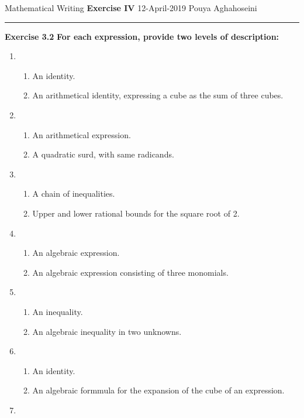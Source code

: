 \documentclass{article}
\begin{document}
\noindent
Mathematical Writing \hfill \textbf{Exercise IV} \newline 
{12-April-2019} \hfill Pouya Aghahoseini

\noindent
\rule{\linewidth}{0.4pt}
\textbf{\large\color{blue} Exercise 3.2}   \textbf{For each expression, provide two levels of description:}

	\begin{enumerate}
		\item 
		\begin{enumerate}[label=\roman*]
			\item  An identity.
			\item An arithmetical identity, expressing a cube as the sum of three cubes.
		\end{enumerate}
	\item
		\begin{enumerate}[label=\roman*]
			\item  An arithmetical expression.
			\item A quadratic surd, with same radicands.
		\end{enumerate}
	\item
		\begin{enumerate}[label=\roman*]
			\item  A chain of inequalities.
			\item Upper and lower rational bounds for the square root of 2.
		\end{enumerate}
	\item
		\begin{enumerate}[label=\roman*]
			\item  An algebraic expression.
			\item  An algebraic expression consisting of three monomials.
		\end{enumerate}
	\item
		\begin{enumerate}[label=\roman*]
			\item  An inequality.
			\item An algebraic inequality in two unknowns.
		\end{enumerate}
		\item
		\begin{enumerate}[label=\roman*]
			\item  An identity.
			\item An algebraic formmula for the expansion of the cube of an expression.
		\end{enumerate}
		\item

\end{enumerate}
\end{document}
